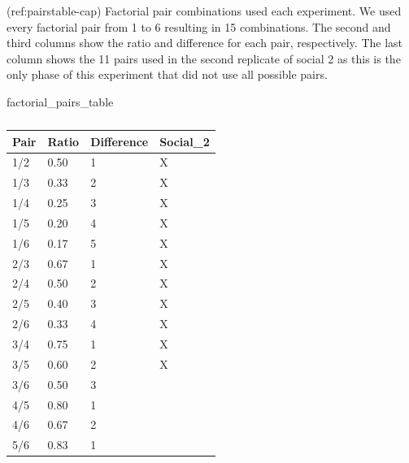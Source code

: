 \documentclass[
]{article}
\newenvironment{Shaded}{\begin{snugshade}}{\end{snugshade}}
\newcommand{\NormalTok}[1]{#1}
\begin{document}
\renewcommand{\thetable}{A\arabic{table}}
\setcounter{table}{0}
\renewcommand{\thefigure}{A\arabic{figure}}

\setcounter{figure}{0}

(ref:pairstable-cap) Factorial pair combinations used each experiment.
We used every factorial pair from 1 to 6 resulting in 15 combinations.
The second and third columns show the ratio and difference for each
pair, respectively. The last column shows the 11 pairs used in the
second replicate of social 2 as this is the only phase of this
experiment that did not use all possible pairs.

\begin{Shaded}
\begin{Highlighting}[]
\NormalTok{factorial\_pairs\_table }
\end{Highlighting}
\end{Shaded}

\begin{table}[tbp]

\begin{center}
\begin{threeparttable}

\caption{\label{tab:unnamed-chunk-1}}

\begin{tabular}{llll}
\toprule
Pair & \multicolumn{1}{c}{Ratio} & \multicolumn{1}{c}{Difference} & \multicolumn{1}{c}{Social\_2}\\
\midrule
1/2 & 0.50 & 1 & X\\
1/3 & 0.33 & 2 & X\\
1/4 & 0.25 & 3 & X\\
1/5 & 0.20 & 4 & X\\
1/6 & 0.17 & 5 & X\\
2/3 & 0.67 & 1 & X\\
2/4 & 0.50 & 2 & X\\
2/5 & 0.40 & 3 & X\\
2/6 & 0.33 & 4 & X\\
3/4 & 0.75 & 1 & X\\
3/5 & 0.60 & 2 & X\\
3/6 & 0.50 & 3 & \\
4/5 & 0.80 & 1 & \\
4/6 & 0.67 & 2 & \\
5/6 & 0.83 & 1 & \\
\bottomrule
\end{tabular}

\end{threeparttable}
\end{center}

\end{table}
\end{document}

